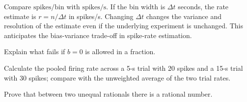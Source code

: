 \begin{workedexample}
Compare $\mathrm{spikes}/\mathrm{bin}$ with $\mathrm{spikes}/\mathrm{s}$. If the bin width is $\Delta t$ seconds, the rate estimate is $r=n/\Delta t$ in spikes/s. Changing $\Delta t$ changes the variance and resolution of the estimate even if the underlying experiment is unchanged. This anticipates the bias-variance trade-off in spike-rate estimation.
\end{workedexample}
\begin{exercises}
\item Explain what fails if $b=0$ is allowed in a fraction.
\item Calculate the pooled firing rate across a 5-s trial with 20 spikes and a 15-s trial with 30 spikes; compare with the unweighted average of the two trial rates.
\item Prove that between two unequal rationals there is a rational number.
\end{exercises}